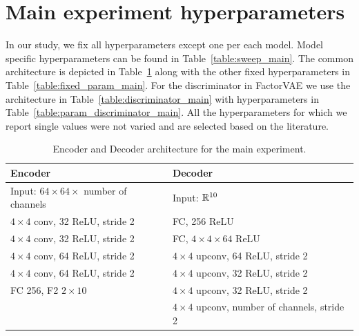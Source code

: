 \section{Main experiment hyperparameters}\label{app:hyperparameters}
In our study, we fix all hyperparameters except one per each model. 
Model specific hyperparameters can be found in Table~\ref{table:sweep_main}. 
The common architecture is depicted in Table~\ref{table:architecture_main} along with the other fixed hyperparameters in Table~\ref{table:fixed_param_main}. 
For the discriminator in FactorVAE we use the architecture in Table~\ref{table:discriminator_main} with hyperparameters in Table~\ref{table:param_discriminator_main}. 
All the hyperparameters for which we report single values were not varied and are selected based on the literature. 
\begin{table}
\centering
\caption{Encoder and Decoder architecture for the main experiment.}
\vspace{2mm}
\begin{tabular}{l  l}
\toprule
\textbf{Encoder} & \textbf{Decoder}\\
\midrule 
Input: $64\times 64 \times$ number of channels & Input: $\mathbb{R}^{10}$\\
$4\times 4$ conv, 32 ReLU, stride 2 & FC, 256 ReLU\\
$4\times 4$ conv, 32 ReLU, stride 2 & FC, $4\times 4\times 64$ ReLU\\
$4\times 4$ conv, 64 ReLU, stride 2 & $4\times 4$ upconv, 64 ReLU, stride 2\\
$4\times 4$ conv, 64 ReLU, stride 2 & $4\times 4$ upconv, 32 ReLU, stride 2\\
FC 256, F2 $2\times 10$ & $4\times 4$ upconv, 32 ReLU, stride 2\\
& $4\times 4$ upconv, number of channels, stride 2\\
\bottomrule
\end{tabular}
\label{table:architecture_main}
\end{table}

